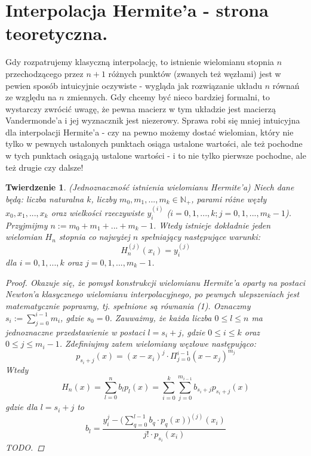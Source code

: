 \documentclass[10pt,wide]{mwart}
\newtheorem{tw}{Twierdzenie}
\theoremstyle{definition}
\begin{document}
 \section{Interpolacja Hermite'a - strona teoretyczna.}
Gdy rozpatrujemy klasyczną interpolację, to istnienie wielomianu stopnia \(n\) przechodzącego przez \(n+1\) różnych punktów (zwanych też węzłami) jest w pewien sposób intuicyjnie oczywiste - wygląda jak rozwiązanie układu \(n \) równań ze względu na \(n\) zmiennych. Gdy chcemy być nieco bardziej formalni, to wystarczy zwrócić uwagę, że pewna macierz w tym układzie jest macierzą Vandermonde'a i jej wyznacznik jest niezerowy. Sprawa robi się mniej intuicyjna dla interpolacji Hermite'a - czy na pewno możemy dostać wielomian, który nie tylko w pewnych ustalonych punktach osiąga ustalone wartości, ale też pochodne w tych punktach osiągają ustalone wartości - i to nie tylko pierwsze pochodne, ale też drugie czy dalsze!
\begin{tw} (Jednoznaczność istnienia wielomianu Hermite'a)
Niech dane będą: liczba naturalna \(k\), liczby \(m_0, m_1, ..., m_k \in \mathbb{N}_+\), parami różne węzły \(x_0, x_1, ..., x_k\) oraz wielkości rzeczywiste \(y_i^{(i)}\) (\(i = 0,1,...,k; j = 0,1,...,m_k - 1\)). Przyjmijmy \(n := m_0 + m_1 + ... + m_k - 1 \). Wtedy istnieje dokładnie jeden wielomian \(H_n\) stopnia co najwyżej \(n\) spełniający następujące warunki:
\begin{equation}
H_n^{(j)}(x_i) = y_i^{(j)}
\end{equation}
dla \(i = 0, 1, ..., k\) oraz \(j = 0, 1, ..., m_k - 1\).

\begin{proof}
Okazuje się, że pomysł konstrukcji wielomianu Hermite'a oparty na postaci Newton'a klasycznego wielomianu interpolacyjnego, po pewnych ulepszeniach jest matematycznie poprawny, tj. spełnione są równania (1).
Oznaczmy \(s_i := \sum_{j=0}^{i-1} m_i\), gdzie \(s_0 = 0\). Zauważmy, że każda liczba \(0 \leq l \leq n\) ma jednoznaczne przedstawienie w postaci \(l = s_i + j\), gdzie \(0 \leq i \leq k\) oraz \(0 \leq j \leq m_i - 1\).
Zdefiniujmy zatem wielomiany węzłowe następująco:
\begin{equation}
p_{s_i + j}(x) = (x-x_i)^j \cdot \Pi_{j=0}^{i-1}(x - x_j)^{m_j}
\end{equation}
Wtedy
\begin{equation}
H_n(x) = \sum_{l=0}^{n}b_lp_l(x) = \sum_{i=0}^{k}\sum_{j = 0}^{m_{i-1}} b_{s_i + j} p_{s_i + j}(x)
\end{equation}
gdzie dla \(l = s_i + j\) to
\begin{equation}
b_l = \frac{y_i^j - \Big(\sum_{q=0}^{l-1}b_q \cdot p_q(x)\Big)^{(j)}(x_i)}{j!\cdot p_{s_i}(x_i)}
\end{equation}
TODO.
\end{proof}
\end{tw}
\end{document}
